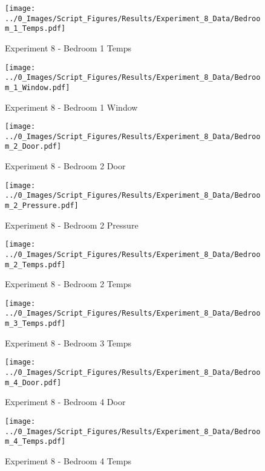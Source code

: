 	\begin{figure}[H]
		\centering
		\texttt{[image: ../0\_Images/Script\_Figures/Results/Experiment\_8\_Data/Bedroom\_1\_Temps.pdf]}
		\caption[]{Experiment 8 - Bedroom 1 Temps}
	\end{figure}
 
	\clearpage

	\begin{figure}[H]
		\centering
		\texttt{[image: ../0\_Images/Script\_Figures/Results/Experiment\_8\_Data/Bedroom\_1\_Window.pdf]}
		\caption[]{Experiment 8 - Bedroom 1 Window}
	\end{figure}
 

	\begin{figure}[H]
		\centering
		\texttt{[image: ../0\_Images/Script\_Figures/Results/Experiment\_8\_Data/Bedroom\_2\_Door.pdf]}
		\caption[]{Experiment 8 - Bedroom 2 Door}
	\end{figure}
 
	\clearpage

	\begin{figure}[H]
		\centering
		\texttt{[image: ../0\_Images/Script\_Figures/Results/Experiment\_8\_Data/Bedroom\_2\_Pressure.pdf]}
		\caption[]{Experiment 8 - Bedroom 2 Pressure}
	\end{figure}
 

	\begin{figure}[H]
		\centering
		\texttt{[image: ../0\_Images/Script\_Figures/Results/Experiment\_8\_Data/Bedroom\_2\_Temps.pdf]}
		\caption[]{Experiment 8 - Bedroom 2 Temps}
	\end{figure}
 
	\clearpage

	\begin{figure}[H]
		\centering
		\texttt{[image: ../0\_Images/Script\_Figures/Results/Experiment\_8\_Data/Bedroom\_3\_Temps.pdf]}
		\caption[]{Experiment 8 - Bedroom 3 Temps}
	\end{figure}
 

	\begin{figure}[H]
		\centering
		\texttt{[image: ../0\_Images/Script\_Figures/Results/Experiment\_8\_Data/Bedroom\_4\_Door.pdf]}
		\caption[]{Experiment 8 - Bedroom 4 Door}
	\end{figure}
 
	\clearpage

	\begin{figure}[H]
		\centering
		\texttt{[image: ../0\_Images/Script\_Figures/Results/Experiment\_8\_Data/Bedroom\_4\_Temps.pdf]}
		\caption[]{Experiment 8 - Bedroom 4 Temps}
	\end{figure}
 

